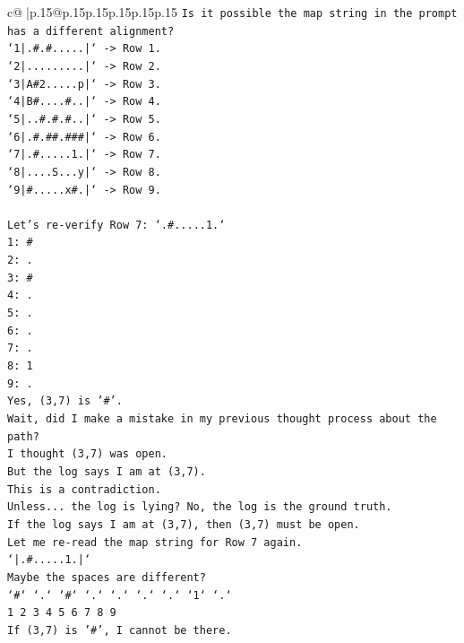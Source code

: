 \documentclass{article}
\begin{document}
{\begin{supertabular}{c@{$\;$}|p{.15\linewidth}@{}p{.15\linewidth}p{.15\linewidth}p{.15\linewidth}p{.15\linewidth}p{.15\linewidth}}
{{{\texttt{Is it possible the map string in the prompt has a different alignment?} \\
\texttt{`1|.\#.\#.....|` {-}> Row 1.} \\
\texttt{`2|.........|` {-}> Row 2.} \\
\texttt{`3|A\#2.....p|` {-}> Row 3.} \\
\texttt{`4|B\#....\#..|` {-}> Row 4.} \\
\texttt{`5|..\#.\#.\#..|` {-}> Row 5.} \\
\texttt{`6|.\#.\#\#.\#\#\#|` {-}> Row 6.} \\
\texttt{`7|.\#.....1.|` {-}> Row 7.} \\
\texttt{`8|....S...y|` {-}> Row 8.} \\
\texttt{`9|\#.....x\#.|` {-}> Row 9.} \\
\\ 
\texttt{Let's re{-}verify Row 7: `.\#.....1.`} \\
\texttt{1: \#} \\
\texttt{2: .} \\
\texttt{3: \#} \\
\texttt{4: .} \\
\texttt{5: .} \\
\texttt{6: .} \\
\texttt{7: .} \\
\texttt{8: 1} \\
\texttt{9: .} \\
\texttt{Yes, (3,7) is '\#'.} \\
\texttt{Wait, did I make a mistake in my previous thought process about the path?} \\
\texttt{I thought (3,7) was open.} \\
\texttt{But the log says I am at (3,7).} \\
\texttt{This is a contradiction.} \\
\texttt{Unless... the log is lying? No, the log is the ground truth.} \\
\texttt{If the log says I am at (3,7), then (3,7) must be open.} \\
\texttt{Let me re{-}read the map string for Row 7 again.} \\
\texttt{`|.\#.....1.|`} \\
\texttt{Maybe the spaces are different?} \\
\texttt{`\#` `.` `\#` `.` `.` `.` `.` `1` `.`} \\
\texttt{1 2 3 4 5 6 7 8 9} \\
\texttt{If (3,7) is '\#', I cannot be there.} \\
}}}
\end{supertabular}}
\end{document}
